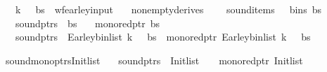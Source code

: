 \begin{isabellebody}
\ \ \ {\isachardoublequoteopen}{\isacharparenleft}{\kern0pt}k{\isacharcomma}{\kern0pt}\ {\isasymG}{\isacharcomma}{\kern0pt}\ {\isasymomega}{\isacharcomma}{\kern0pt}\ bs{\isacharparenright}{\kern0pt}\ {\isasymin}\ wf{\isacharunderscore}{\kern0pt}earley{\isacharunderscore}{\kern0pt}input{\isachardoublequoteclose}\isanewline
\ \ \ {\isachardoublequoteopen}nonempty{\isacharunderscore}{\kern0pt}derives\ {\isasymG}{\isachardoublequoteclose}\isanewline
\ \ \ {\isachardoublequoteopen}sound{\isacharunderscore}{\kern0pt}items\ {\isasymG}\ {\isasymomega}\ {\isacharparenleft}{\kern0pt}bins\ bs{\isacharparenright}{\kern0pt}{\isachardoublequoteclose}\isanewline
\ \ \ {\isachardoublequoteopen}sound{\isacharunderscore}{\kern0pt}ptrs\ {\isasymomega}\ bs{\isachardoublequoteclose}\isanewline
\ \ \ {\isachardoublequoteopen}mono{\isacharunderscore}{\kern0pt}red{\isacharunderscore}{\kern0pt}ptr\ bs{\isachardoublequoteclose}\isanewline
\ \ \ {\isachardoublequoteopen}sound{\isacharunderscore}{\kern0pt}ptrs\ {\isasymomega}\ {\isacharparenleft}{\kern0pt}Earley{\isacharunderscore}{\kern0pt}bin{\isacharunderscore}{\kern0pt}list\ k\ {\isasymG}\ {\isasymomega}\ bs{\isacharparenright}{\kern0pt}\ {\isasymand}\ mono{\isacharunderscore}{\kern0pt}red{\isacharunderscore}{\kern0pt}ptr\ {\isacharparenleft}{\kern0pt}Earley{\isacharunderscore}{\kern0pt}bin{\isacharunderscore}{\kern0pt}list\ k\ {\isasymG}\ {\isasymomega}\ bs{\isacharparenright}{\kern0pt}{\isachardoublequoteclose}%
\isadelimproof
%
\endisadelimproof
%
\isatagproof
%
\endisatagproof
{\isafoldproof}%
%
\isadelimproof
%
\endisadelimproof
%
\begin{isamarkuptext}%
%
\end{isamarkuptext}\isamarkuptrue%
\isamarkupfalse%
\ sound{\isacharunderscore}{\kern0pt}mono{\isacharunderscore}{\kern0pt}ptrs{\isacharunderscore}{\kern0pt}Init{\isacharunderscore}{\kern0pt}list{\isacharcolon}{\kern0pt}\isanewline
\ \ \ {\isachardoublequoteopen}sound{\isacharunderscore}{\kern0pt}ptrs\ {\isasymomega}\ {\isacharparenleft}{\kern0pt}Init{\isacharunderscore}{\kern0pt}list\ {\isasymG}\ {\isasymomega}{\isacharparenright}{\kern0pt}\ {\isasymand}\ mono{\isacharunderscore}{\kern0pt}red{\isacharunderscore}{\kern0pt}ptr\ {\isacharparenleft}{\kern0pt}Init{\isacharunderscore}{\kern0pt}list\ {\isasymG}\ {\isasymomega}{\isacharparenright}{\kern0pt}{\isachardoublequoteclose}%
\isadelimproof
%
\endisadelimproof
%
\isatagproof
%
\endisatagproof

\end{isabellebody}
